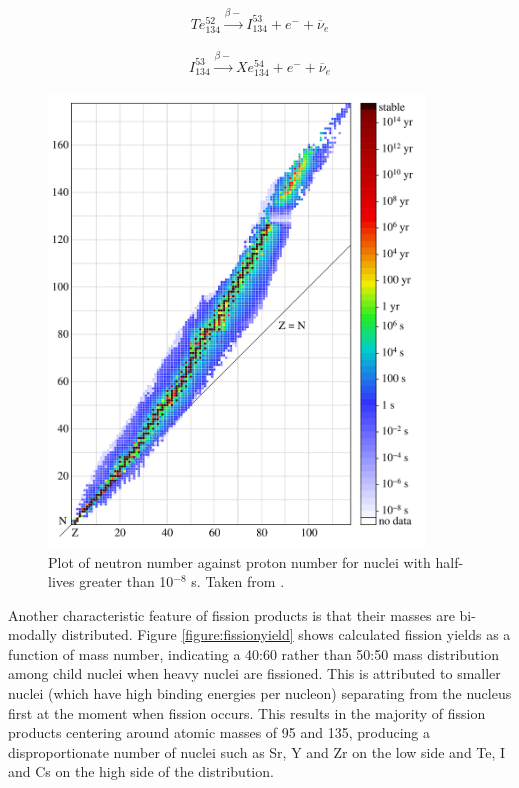 {
\begin{equation}
Te_{134}^{52} \xrightarrow[]{\beta-} I_{134}^{53}+ e^{-} + \overline{\nu}_{e}
\label{eqn:te_decay}
\end{equation}

\begin{equation}
I_{134}^{53} \xrightarrow[]{\beta-} Xe_{134}^{54} + e^{-} + \overline{\nu}_{e}
\label{eqn:i_decay}
\end{equation}
}

\begin{figure}[ht]
\centering
\includegraphics[height=12cm]{images/Isotopes_and_half-life.png}
\caption[Plot of neutron number against proton number for nuclei with half-lives greater than 10${^{-8}}$ s.]{Plot of neutron number against proton number for nuclei with half-lives greater than 10${^{-8}}$ s. Taken from \cite{BenRG}.}
\label{figure:NZcurve}
\end{figure}

Another characteristic feature of fission products is that their masses are bi-modally distributed. Figure \ref{figure:fissionyield} shows calculated fission yields as a function of mass number, indicating a 40:60 rather than 50:50 mass distribution among child nuclei when heavy nuclei are fissioned. This is attributed to smaller nuclei (which have high binding energies per nucleon) separating from the nucleus first at the moment when fission occurs. This results in the majority of fission products centering around atomic masses of 95 and 135, producing a disproportionate number of nuclei such as Sr, Y and Zr on the low side and Te, I and Cs on the high side of the distribution. 


